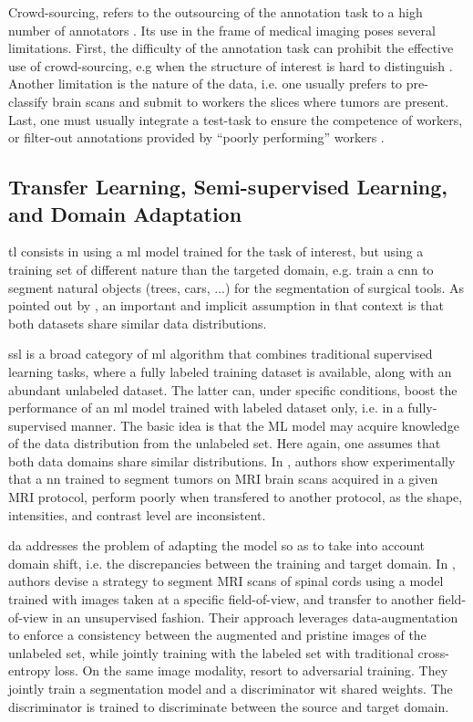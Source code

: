 Crowd-sourcing, refers to the outsourcing of the annotation task to a high number of annotators \cite{orting19}.
Its use in the frame of medical imaging poses several limitations.
First, the difficulty of the annotation task can prohibit the effective use of crowd-sourcing, e.g when the structure of interest is hard to distinguish \cite{orting19}.
Another limitation is the nature of the data, i.e. one usually prefers to pre-classify brain scans and submit to workers the slices where tumors are present.
Last, one must usually integrate a test-task to ensure the competence of workers, or filter-out annotations provided by ``poorly performing'' workers \cite{park18}.

\subsection{Transfer Learning, Semi-supervised Learning, and Domain Adaptation}
\gls{tl} consists in using a \gls{ml} model trained for the task of interest, but using a training set of different nature than the targeted domain, e.g. train a \gls{cnn} to segment natural objects (trees, cars, ...) for the segmentation of surgical tools.
As pointed out by \cite{oliver18}, an important and implicit assumption in that context is that both datasets share similar data distributions.

\gls{ssl} is a broad category of \gls{ml} algorithm that combines traditional supervised learning tasks, where a fully labeled training dataset is available, along with an abundant unlabeled dataset.
The latter can, under specific conditions, boost the performance of an \gls{ml} model trained with labeled dataset only, i.e. in a fully-supervised manner.
The basic idea is that the ML model may acquire knowledge of the data distribution from the unlabeled set.
Here again, one assumes that both data domains share similar distributions.
In \cite{ghafoorian17}, authors show experimentally that a \gls{nn} trained to segment tumors on MRI brain scans acquired in a given MRI protocol, perform poorly when transfered to another protocol, as the shape, intensities, and contrast level are inconsistent.

\gls{da} addresses the problem of adapting the model so as to take into account domain shift, i.e. the discrepancies between the training and target domain.
In \cite{perone19}, authors devise a strategy to segment MRI scans of spinal cords using a model trained with images taken at a specific field-of-view, and transfer to another field-of-view in an unsupervised fashion.
Their approach leverages data-augmentation to enforce a consistency between the augmented and pristine images of the unlabeled set, while jointly training with the labeled set with traditional cross-entropy loss.
On the same image modality, \cite{li20} resort to adversarial training. They jointly train a segmentation model and a discriminator wit shared weights. The discriminator is trained to discriminate between the source and target domain.





